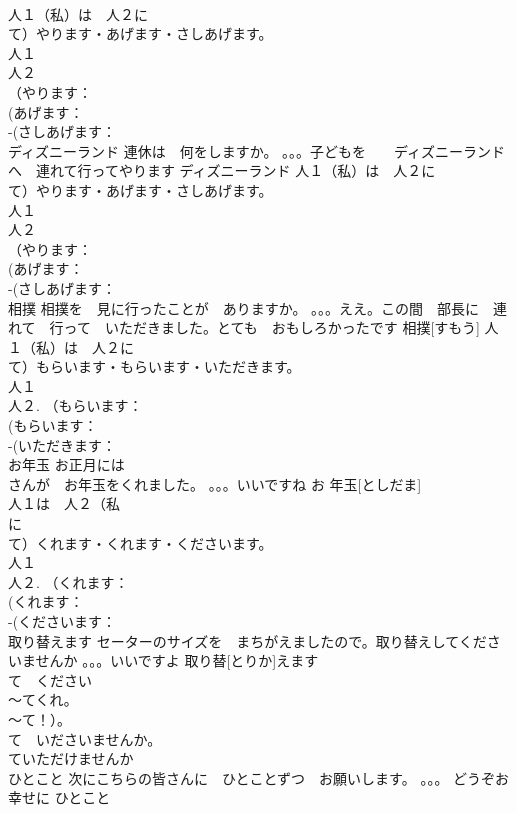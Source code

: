 \documentclass[8pt]{extreport}
\begin{document}
\begin{CJK}{UTF8}{min}
\\	人１（私）は　人２に　
\\	て）やります・あげます・さしあげます。
\\	人１
\\	人２
\\	（やります：
\\	(あげます：
\\	-(さしあげます：
\\	ディズニーランド	連休は　何をしますか。 。。。子どもを　　ディズニーランドへ　連れて行ってやります	ディズニーランド				人１（私）は　人２に　
\\	て）やります・あげます・さしあげます。
\\	人１
\\	人２
\\	（やります：
\\	(あげます：
\\	-(さしあげます：
\\	相撲	相撲を　見に行ったことが　ありますか。 。。。ええ。この間　部長に　連れて　行って　いただきました。とても　おもしろかったです	相撲[すもう]				人１（私）は　人２に　
\\	て）もらいます・もらいます・いただきます。
\\	人１
\\	人２. （もらいます：
\\	(もらいます：
\\	-(いただきます：
\\	お年玉	お正月には　
\\	さんが　お年玉をくれました。 。。。いいですね	お 年玉[としだま]			
\\	人１は　人２（私
\\	に　
\\	て）くれます・くれます・くださいます。
\\	人１
\\	人２. （くれます：
\\	(くれます：
\\	-(くださいます：
\\	取り替えます	セーターのサイズを　まちがえましたので。取り替えしてくださいませんか 。。。いいですよ	取り替[とりか]えます			
\\	て　ください　
\\	～てくれ。
\\	～て！）。　
\\	て　いださいませんか。
\\	ていただけませんか 
\\	ひとこと	次にこちらの皆さんに　ひとことずつ　お願いします。 。。。 どうぞお幸せに	ひとこと			

\end{CJK}
\end{document}
